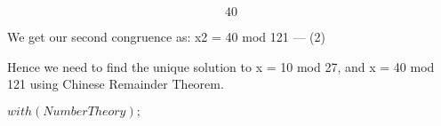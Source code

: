 \documentclass{article}
\begin{document}
\begin{dmath}\label{(8)}
40
\end{dmath}
\begin{Maple Normal}
We get our second congruence as: x2 = 40 mod 121 --- (2)
\end{Maple Normal}
\begin{Maple Normal}

\end{Maple Normal}
\begin{Maple Normal}
Hence  we need to find the unique solution to x = 10 mod 27, and x = 40 mod 121 using Chinese Remainder Theorem.
\end{Maple Normal}
\begin{Maple Normal}

\end{Maple Normal}
\mapleinput
{$ \displaystyle \mathit{with} (\mathit{NumberTheory}); $}
\end{document}
